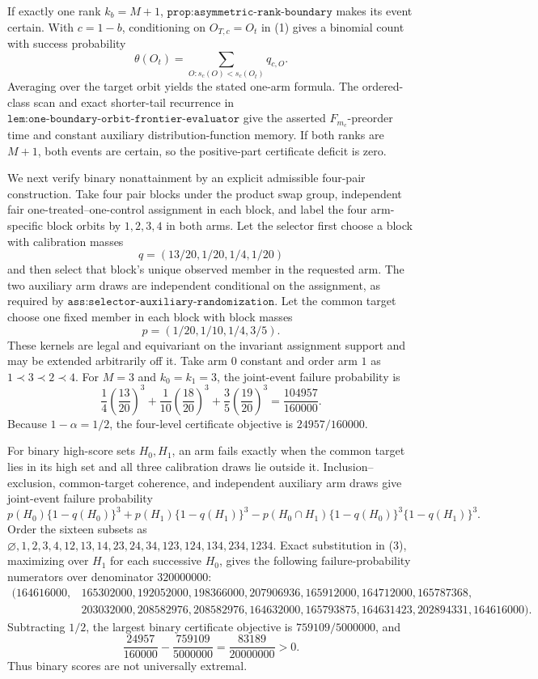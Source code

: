 If exactly one rank \(k_b=M+1\), \(\texttt{prop:asymmetric-rank-boundary}\) makes its event certain. With \(c=1-b\), conditioning on \(O_{T,c}=O_t\) in (1) gives a binomial count with success probability
\[
\theta(O_t)=\sum_{O:s_c(O)<s_c(O_t)}q_{c,O}.
\]
Averaging over the target orbit yields the stated one-arm formula. The ordered-class scan and exact shorter-tail recurrence in \(\texttt{lem:one-boundary-orbit-frontier-evaluator}\) give the asserted \(F_{m_c}\)-preorder time and constant auxiliary distribution-function memory. If both ranks are \(M+1\), both events are certain, so the positive-part certificate deficit is zero.

We next verify binary nonattainment by an explicit admissible four-pair construction. Take four pair blocks under the product swap group, independent fair one-treated--one-control assignment in each block, and label the four arm-specific block orbits by \(1,2,3,4\) in both arms. Let the selector first choose a block with calibration masses
\[
q=(13/20,1/20,1/4,1/20)
\]
and then select that block's unique observed member in the requested arm. The two auxiliary arm draws are independent conditional on the assignment, as required by \(\texttt{ass:selector-auxiliary-randomization}\). Let the common target choose one fixed member in each block with block masses
\[
p=(1/20,1/10,1/4,3/5).
\]
These kernels are legal and equivariant on the invariant assignment support and may be extended arbitrarily off it. Take arm \(0\) constant and order arm \(1\) as \(1\prec3\prec2\prec4\). For \(M=3\) and \(k_0=k_1=3\), the joint-event failure probability is
\[
\frac14\left(\frac{13}{20}\right)^3+\frac1{10}\left(\frac{18}{20}\right)^3+\frac35\left(\frac{19}{20}\right)^3=\frac{104957}{160000}.
\]
Because \(1-\alpha=1/2\), the four-level certificate objective is \(24957/160000\).

For binary high-score sets \(H_0,H_1\), an arm fails exactly when the common target lies in its high set and all three calibration draws lie outside it. Inclusion--exclusion, common-target coherence, and independent auxiliary arm draws give joint-event failure probability
\[
p(H_0)\{1-q(H_0)\}^3+p(H_1)\{1-q(H_1)\}^3-p(H_0\cap H_1)\{1-q(H_0)\}^3\{1-q(H_1)\}^3.
\tag{3}
\]
Order the sixteen subsets as \(\varnothing,1,2,3,4,12,13,14,23,24,34,123,124,134,234,1234\). Exact substitution in (3), maximizing over \(H_1\) for each successive \(H_0\), gives the following failure-probability numerators over denominator \(320000000\):
\[
\begin{split}
(164616000,&165302000,192052000,198366000,207906936,165912000,164712000,165787368,\\
&203032000,208582976,208582976,164632000,165793875,164631423,202894331,164616000).
\end{split}
\]
Subtracting \(1/2\), the largest binary certificate objective is \(759109/5000000\), and
\[
\frac{24957}{160000}-\frac{759109}{5000000}=\frac{83189}{20000000}>0.
\]
Thus binary scores are not universally extremal.

